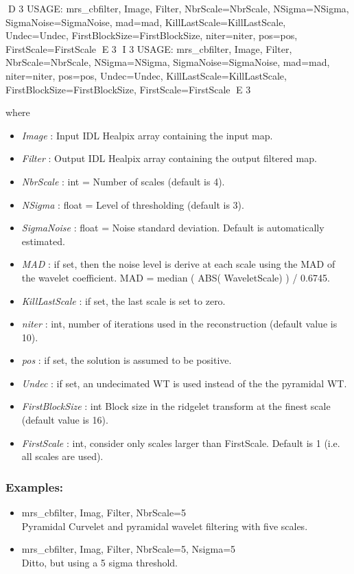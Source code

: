 {\bf
\begin{center}
D 3
     USAGE:  mrs\_cbfilter, Image, Filter, NbrScale=NbrScale, NSigma=NSigma, SigmaNoise=SigmaNoise, mad=mad, KillLastScale=KillLastScale, 
     						Undec=Undec, FirstBlockSize=FirstBlockSize, niter=niter, pos=pos, FirstScale=FirstScale     
E 3
I 3
     USAGE: mrs\_cbfilter, Image, Filter, NbrScale=NbrScale, NSigma=NSigma, SigmaNoise=SigmaNoise, mad=mad, niter=niter, pos=pos, 
     						Undec=Undec, KillLastScale=KillLastScale, FirstBlockSize=FirstBlockSize, FirstScale=FirstScale     
E 3
\end{center}}
where
\begin{itemize}
\item {\em Image} : Input IDL Healpix array containing the input map.
\item {\em Filter} : Output IDL Healpix array containing the output filtered map.
\item {\em NbrScale} : int = Number of scales (default is 4).
\item {\em NSigma} : float = Level of thresholding (default is 3).
\item {\em SigmaNoise} : float = Noise standard deviation. Default is automatically estimated.
\item {\em MAD} : if set, then the noise level is derive at each scale using the MAD of the   
wavelet coefficient. MAD = median ( ABS( WaveletScale) ) / 0.6745.
\item {\em KillLastScale} : if set, the last scale is set to zero.
\item {\em niter} : int, number of iterations used in the reconstruction (default value is 10).
\item {\em pos} : if set, the solution is assumed to be positive.
\item {\em Undec} : if set, an undecimated WT is used instead of the the pyramidal WT.
\item {\em FirstBlockSize} : int Block size in the ridgelet transform at the finest scale (default value is 16).
\item {\em FirstScale} : int, consider only scales larger than FirstScale. Default is 1 (i.e. all scales are used).
\end{itemize}

\subsubsection*{Examples:} 
\begin{itemize}
\item mrs\_cbfilter, Imag, Filter, NbrScale=5 \\
Pyramidal Curvelet and pyramidal wavelet filtering with five scales.
\item mrs\_cbfilter, Imag, Filter, NbrScale=5, Nsigma=5 \\
Ditto, but using a 5 sigma threshold.
\end{itemize}


